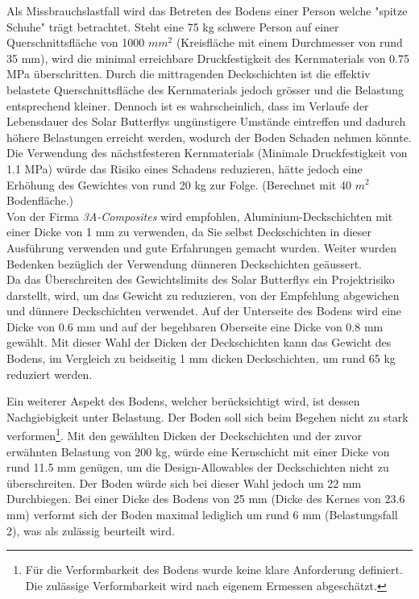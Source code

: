 Als Missbrauchslastfall wird das Betreten des Bodens einer Person welche "spitze Schuhe" trägt betrachtet. Steht eine 75 kg schwere Person auf einer Querschnittsfläche von 1000 $mm^2$ (Kreisfläche mit einem Durchmesser von rund 35 mm), wird die minimal erreichbare Druckfestigkeit des Kernmaterials von 0.75 MPa überschritten. Durch die mittragenden Deckschichten ist die effektiv belastete Querschnittsfläche des Kernmaterials jedoch grösser und die Belastung entsprechend kleiner. Dennoch ist es wahrscheinlich, dass im Verlaufe der Lebensdauer des Solar Butterflys ungünstigere Umstände eintreffen und dadurch höhere Belastungen erreicht werden, wodurch der Boden Schaden nehmen könnte. Die Verwendung des nächstfesteren Kernmaterials (Minimale Druckfestigkeit von 1.1 MPa) würde das Risiko eines Schadens reduzieren, hätte jedoch eine Erhöhung des Gewichtes von rund 20 kg zur Folge. (Berechnet mit 40 $m^2$ Bodenfläche.)\\
Von der Firma \emph{3A-Composites} wird empfohlen, Aluminium-Deckschichten mit einer Dicke von 1 mm zu verwenden, da Sie selbst Deckschichten in dieser Ausführung verwenden und gute Erfahrungen gemacht wurden. Weiter wurden Bedenken bezüglich der Verwendung dünneren Deckschichten geäussert.\\
Da das Überschreiten des Gewichtslimits des Solar Butterflys ein Projektrisiko darstellt, wird, um das Gewicht zu reduzieren, von der Empfehlung abgewichen und dünnere Deckschichten verwendet. Auf der Unterseite des Bodens wird eine Dicke von 0.6 mm und auf der begehbaren Oberseite eine Dicke von 0.8 mm gewählt. Mit dieser Wahl der Dicken der Deckschichten kann das Gewicht des Bodens, im Vergleich zu beidseitig 1 mm dicken Deckschichten, um rund 65 kg reduziert werden.

Ein weiterer Aspekt des Bodens, welcher berücksichtigt wird, ist dessen Nachgiebigkeit unter Belastung. Der Boden soll sich beim Begehen nicht zu stark verformen\footnote{Für die Verformbarkeit des Bodens wurde keine klare Anforderung definiert. Die zulässige Verformbarkeit wird nach eigenem Ermessen abgeschätzt.}.  Mit den gewählten Dicken der Deckschichten und der zuvor erwähnten Belastung von 200 kg, würde eine Kernschicht mit einer Dicke von rund 11.5 mm genügen, um die Design-Allowables der Deckschichten nicht zu überschreiten. Der Boden würde sich bei dieser Wahl jedoch um 22 mm Durchbiegen. Bei einer Dicke des Bodens von 25 mm (Dicke des Kernes von 23.6 mm) verformt sich der Boden maximal lediglich um rund 6 mm (Belastungsfall 2), was als zulässig beurteilt wird.

